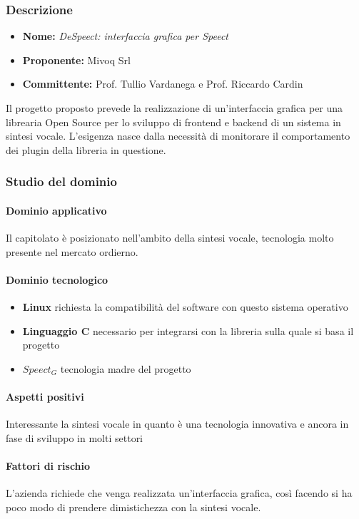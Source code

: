 	\subsubsection{Descrizione}
	\begin{itemize}
		\item \textbf{Nome:} \emph{DeSpeect: interfaccia grafica per Speect}
		\item \textbf{Proponente:} Mivoq Srl
		\item \textbf{Committente:} Prof. Tullio Vardanega e Prof. Riccardo Cardin
     \end{itemize}	
		Il progetto proposto prevede la realizzazione di un'interfaccia grafica per una librearia Open Source per lo sviluppo di frontend e backend di un sistema in sintesi vocale.
		L'esigenza nasce dalla necessità di monitorare il comportamento dei plugin della libreria in questione.
	\subsubsection{Studio del dominio}
	
	\paragraph{Dominio applicativo} \Spazio
     Il capitolato è posizionato nell'ambito della sintesi vocale, tecnologia molto presente nel mercato ordierno. 
	\paragraph{Dominio tecnologico}
	\begin{itemize}
		\item \textbf{Linux} richiesta la compatibilità del software con questo sistema operativo
		\item  \textbf{Linguaggio C} necessario per integrarsi con la libreria sulla quale si basa il progetto
		\item  \textbf{$Speect_G$} tecnologia madre del progetto
	\end{itemize}
	\paragraph{Aspetti positivi} \Spazio
	Interessante la sintesi vocale in quanto è una tecnologia innovativa e ancora in fase di sviluppo in molti settori  
	\paragraph{Fattori di rischio} \Spazio
	L'azienda richiede che venga realizzata un'interfaccia grafica, così facendo si ha poco modo di prendere dimistichezza con la sintesi vocale. 
